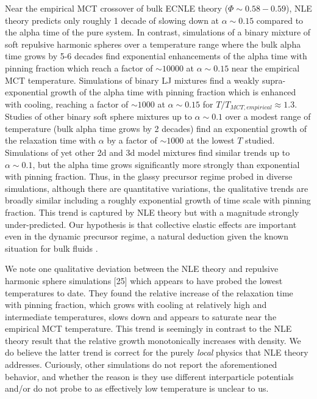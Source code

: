 \documentclass[twocolumn,showpacs,preprintnumbers,amsmath,amssymb,unsortedaddress,
]{revtex4-1}
\begin{document}
Near the empirical MCT crossover of bulk ECNLE theory ($\Phi\sim 0.58-0.59$), NLE theory predicts only roughly 1 decade of slowing down at $\alpha\sim 0.15$ compared to the alpha time of the pure system. In contrast, simulations of a binary mixture of soft repulsive harmonic spheres \cite{23,25} over a temperature range where the bulk alpha time grows by 5-6 decades find exponential enhancements of the alpha time with pinning fraction which reach a factor of $\sim 10000$ at $\alpha\sim 0.15$ near the empirical MCT temperature.  Simulations of binary LJ mixtures \cite{26} find a weakly supra-exponential growth of the alpha time with pinning fraction which is enhanced with cooling, reaching a factor of $\sim 1000$ at $\alpha\sim 0.15$ for $T/T_{MCT,empirical}\approx 1.3$. Studies of other binary soft sphere mixtures \cite{27} up to $\alpha\sim 0.1$ over a modest range of temperature (bulk alpha time grows by 2 decades) find an exponential growth of the relaxation time with $\alpha$ by a factor of $\sim 1000$ at the lowest $T$ studied. Simulations of yet other 2d and 3d model mixtures \cite{28} find similar trends up to $\alpha\sim 0.1$, but the alpha time grows significantly more strongly than exponential with pinning fraction. Thus, in the glassy precursor regime probed in diverse simulations, although there are quantitative variations, the qualitative trends are broadly similar including a roughly exponential growth of time scale with pinning fraction. This trend is captured by NLE theory but with a magnitude strongly under-predicted. Our hypothesis is that collective elastic effects are important even in the dynamic precursor regime, a natural deduction given the known situation for bulk fluids \cite{7,8}.

We note one qualitative deviation between the NLE theory and repulsive harmonic sphere simulations [25] which appears to have probed the lowest temperatures to date. They found the relative increase of the relaxation time with pinning fraction, which grows with cooling at relatively high and intermediate temperatures, slows down and appears to saturate near the empirical MCT temperature. This trend is seemingly in contrast to the NLE theory result that the relative growth monotonically increases with density. We do believe the latter trend is correct for the purely \emph{local} physics that NLE theory addresses. Curiously, other simulations \cite{23,26,27,28} do not report the aforementioned behavior, and whether the reason is they use different interparticle potentials and/or do not probe to as effectively low temperature is unclear to us.
\end{document}
